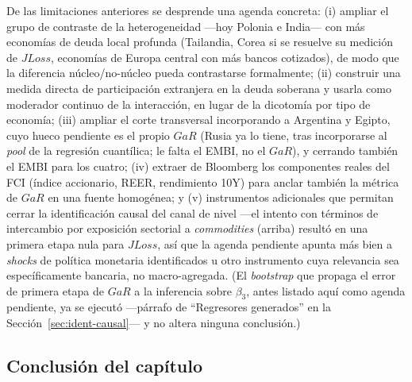 De las limitaciones anteriores se desprende una agenda concreta: (i) ampliar el grupo de contraste de la heterogeneidad —hoy Polonia e India— con más economías de deuda local profunda (Tailandia, Corea si se resuelve su medición de $JLoss$, economías de Europa central con más bancos cotizados), de modo que la diferencia núcleo/no-núcleo pueda contrastarse formalmente; (ii) construir una medida directa de participación extranjera en la deuda soberana y usarla como moderador continuo de la interacción, en lugar de la dicotomía por tipo de economía; (iii) ampliar el corte transversal incorporando a Argentina y Egipto, cuyo hueco pendiente es el propio $GaR$ (Rusia ya lo tiene, tras incorporarse al \textit{pool} de la regresión cuantílica; le falta el EMBI, no el $GaR$), y cerrando también el EMBI para los cuatro; (iv) extraer de Bloomberg los componentes reales del FCI (índice accionario, REER, rendimiento 10Y) para anclar también la métrica de $GaR$ en una fuente homogénea; y (v) instrumentos adicionales que permitan cerrar la identificación causal del canal de nivel —el intento con términos de intercambio por exposición sectorial a \textit{commodities} (arriba) resultó en una primera etapa nula para $JLoss$, así que la agenda pendiente apunta más bien a \textit{shocks} de política monetaria identificados u otro instrumento cuya relevancia sea específicamente bancaria, no macro-agregada. (El \textit{bootstrap} que propaga el error de primera etapa de $GaR$ a la inferencia sobre $\beta_3$, antes listado aquí como agenda pendiente, ya se ejecutó —párrafo de ``Regresores generados'' en la Sección~\ref{sec:ident-causal}— y no altera ninguna conclusión.)

\subsection{Conclusión del capítulo}

